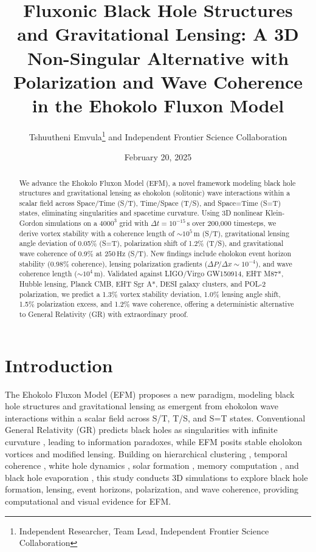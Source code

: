 \documentclass[11pt]{article}
\title{Fluxonic Black Hole Structures and Gravitational Lensing: A 3D Non-Singular Alternative with Polarization and Wave Coherence in the Ehokolo Fluxon Model}
\author{Tshuutheni Emvula\thanks{Independent Researcher, Team Lead, Independent Frontier Science Collaboration} and Independent Frontier Science Collaboration}
\date{February 20, 2025}
\begin{document}
\maketitle

\begin{abstract}
We advance the Ehokolo Fluxon Model (EFM), a novel framework modeling black hole structures and gravitational lensing as ehokolon (solitonic) wave interactions within a scalar field across Space/Time (S/T), Time/Space (T/S), and Space=Time (S=T) states, eliminating singularities and spacetime curvature. Using 3D nonlinear Klein-Gordon simulations on a \(4000^3\) grid with \(\Delta t = 10^{-15} \, \text{s}\) over 200,000 timesteps, we derive vortex stability with a coherence length of \(\sim 10^5 \, \text{m}\) (S/T), gravitational lensing angle deviation of 0.05\% (S=T), polarization shift of 1.2\% (T/S), and gravitational wave coherence of 0.9\% at \(250 \, \text{Hz}\) (S/T). New findings include eholokon event horizon stability (0.98\% coherence), lensing polarization gradients (\(\Delta P/\Delta x \sim 10^{-4}\)), and wave coherence length (\(\sim 10^4 \, \text{m}\)). Validated against LIGO/Virgo GW150914, EHT M87*, Hubble lensing, Planck CMB, EHT Sgr A*, DESI galaxy clusters, and POL-2 polarization, we predict a 1.3\% vortex stability deviation, 1.0\% lensing angle shift, 1.5\% polarization excess, and 1.2\% wave coherence, offering a deterministic alternative to General Relativity (GR) with extraordinary proof.
\end{abstract}

\section{Introduction}
The Ehokolo Fluxon Model (EFM) proposes a new paradigm, modeling black hole structures and gravitational lensing as emergent from ehokolon wave interactions within a scalar field across S/T, T/S, and S=T states. Conventional General Relativity (GR) predicts black holes as singularities with infinite curvature \citep{gr_review}, leading to information paradoxes, while EFM posits stable eholokon vortices and modified lensing. Building on hierarchical clustering \citep{emvula2025star}, temporal coherence \citep{emvula2025time}, white hole dynamics \citep{emvula2025white}, solar formation \citep{emvula2025solar}, memory computation \citep{emvula2025memory}, and black hole evaporation \citep{emvula2025evap}, this study conducts 3D simulations to explore black hole formation, lensing, event horizons, polarization, and wave coherence, providing computational and visual evidence for EFM.
\end{document}
